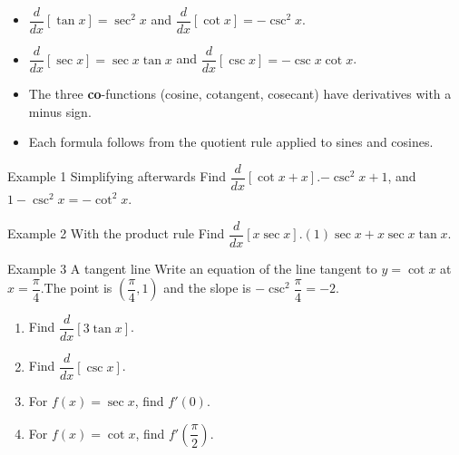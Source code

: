 \documentclass[11pt]{article}
\begin{document}

\begin{ideabox}
\begin{itemize}[leftmargin=*,itemsep=2pt,topsep=2pt]
  \item $\dfrac{d}{dx}[\tan x]=\sec^2x$ \quad and \quad $\dfrac{d}{dx}[\cot x]=-\csc^2x$.
  \item $\dfrac{d}{dx}[\sec x]=\sec x\tan x$ \quad and \quad $\dfrac{d}{dx}[\csc x]=-\csc x\cot x$.
  \item The three \textbf{co}-functions (cosine, cotangent, cosecant) have derivatives with a minus sign.
  \item Each formula follows from the quotient rule applied to sines and cosines.
\end{itemize}
\end{ideabox}

\begin{example}{Example 1 \textperiodcentered{} Simplifying afterwards}
Find $\dfrac{d}{dx}[\cot x+x]$.\soln $-\csc^2x+1$, and $1-\csc^2x=-\cot^2x$.
\end{example}

\begin{example}{Example 2 \textperiodcentered{} With the product rule}
Find $\dfrac{d}{dx}[x\sec x]$.\soln $(1)\sec x+x\sec x\tan x$.
\end{example}

\begin{example}{Example 3 \textperiodcentered{} A tangent line}
Write an equation of the line tangent to $y=\cot x$ at $x=\dfrac\pi4$.\soln The point is $\left(\dfrac\pi4,1\right)$ and the slope is $-\csc^2\dfrac\pi4=-2$.
\end{example}

\newpage
{}

\begin{enumerate}[leftmargin=*,itemsep=2pt]
  \item Find $\dfrac{d}{dx}[3\tan x]$.\work{2.3cm}
  \item Find $\dfrac{d}{dx}[\csc x]$.\work{2.3cm}
  \item For $f(x)=\sec x$, find $f'(0)$.\work{2.3cm}
  \item For $f(x)=\cot x$, find $f'\!\left(\dfrac\pi2\right)$.\work{2.3cm}
\end{enumerate}
\end{document}

